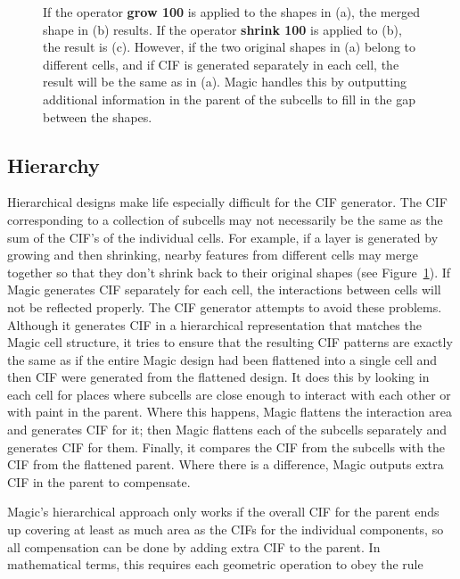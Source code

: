 \documentclass[letterpaper,twoside,12pt]{article}
\begin{document}
\begin{figure}[ht]
   \begin{center}
      \caption{If the operator {\bfseries grow 100} is applied to the
	shapes in (a), the merged shape in (b) results.  If the operator
	{\bfseries shrink 100} is applied to (b), the result is (c).  However,
	if the two original shapes in (a) belong to different cells, and
	if CIF is generated separately in each cell, the result will be
	the same as in (a).  Magic handles this by outputting additional
	information in the parent of the subcells to fill in the gap between
	the shapes.}
      \label{growshrink}
   \end{center}
\end{figure}

\subsection{Hierarchy} \label{hierarchy}

Hierarchical designs make life especially difficult for the
CIF generator.  The CIF corresponding
to a collection of subcells may not necessarily be the same
as the sum of the CIF's of the individual cells.  For example,
if a layer is generated by growing and then shrinking, nearby
features from different cells may merge together so that they
don't shrink back to their original shapes (see Figure~\ref{growshrink}).
If Magic
generates CIF separately for each cell, the interactions between
cells will not be reflected properly.  The CIF generator attempts
to avoid these problems.  Although it generates CIF in a
hierarchical representation that matches the Magic cell structure,
it tries to ensure that the resulting CIF patterns are exactly the same
as if the entire Magic design had been flattened into a single cell
and then CIF were generated from the flattened design.  It does this
by looking in each cell for places where subcells are close enough
to interact with each other or with paint in the parent.  Where this
happens, Magic flattens the interaction area and generates CIF for
it;  then Magic flattens each of the subcells separately and generates
CIF for them.  Finally, it compares the CIF from the subcells with the
CIF from the flattened parent.  Where there is a difference, Magic
outputs extra CIF in the parent to compensate.

Magic's hierarchical approach only works if the overall CIF for the
parent ends up covering at least as much area as the CIFs for the
individual components, so all compensation can be done by adding
extra CIF to the parent.  In mathematical terms, this requires
each geometric operation to obey the rule
\end{document}
